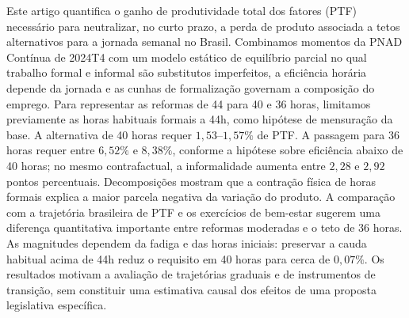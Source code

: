 Este artigo quantifica o ganho de produtividade total dos fatores (PTF) necessário para neutralizar, no curto prazo, a perda de produto associada a tetos alternativos para a jornada semanal no Brasil. Combinamos momentos da PNAD Contínua de 2024T4 com um modelo estático de equilíbrio parcial no qual trabalho formal e informal são substitutos imperfeitos, a eficiência horária depende da jornada e as cunhas de formalização governam a composição do emprego. Para representar as reformas de 44 para 40 e 36 horas, limitamos previamente as horas habituais formais a 44h, como hipótese de mensuração da base. A alternativa de 40 horas requer $1{,}53$--$1{,}57\%$ de PTF. A passagem para 36 horas requer entre $6{,}52\%$ e $8{,}38\%$, conforme a hipótese sobre eficiência abaixo de 40 horas; no mesmo contrafactual, a informalidade aumenta entre $2{,}28$ e $2{,}92$ pontos percentuais. Decomposições mostram que a contração física de horas formais explica a maior parcela negativa da variação do produto. A comparação com a trajetória brasileira de PTF e os exercícios de bem-estar sugerem uma diferença quantitativa importante entre reformas moderadas e o teto de 36 horas. As magnitudes dependem da fadiga e das horas iniciais: preservar a cauda habitual acima de 44h reduz o requisito em 40 horas para cerca de $0{,}07\%$. Os resultados motivam a avaliação de trajetórias graduais e de instrumentos de transição, sem constituir uma estimativa causal dos efeitos de uma proposta legislativa específica.
